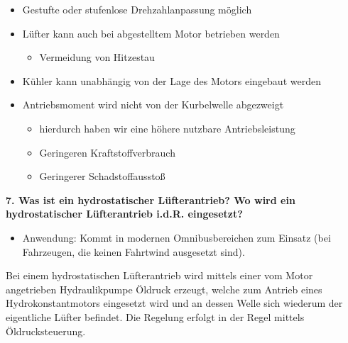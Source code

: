 \begin{itemize}
\item
  Gestufte oder stufenlose Drehzahlanpassung möglich
\item
  Lüfter kann auch bei abgestelltem Motor betrieben werden

  \begin{itemize}
  \item
    Vermeidung von Hitzestau
  \end{itemize}
\item
  Kühler kann unabhängig von der Lage des Motors eingebaut werden
\item
  Antriebsmoment wird nicht von der Kurbelwelle abgezweigt

  \begin{itemize}
  \item
    hierdurch haben wir eine höhere nutzbare Antriebsleistung
  \item
    Geringeren Kraftstoffverbrauch
  \item
    Geringerer Schadstoffausstoß
  \end{itemize}
\end{itemize}

\textbf{7. Was ist ein hydrostatischer Lüfterantrieb? Wo wird ein
hydrostatischer Lüfterantrieb i.d.R. eingesetzt?}

\begin{itemize}
\item
  Anwendung: Kommt in modernen Omnibusbereichen zum Einsatz (bei
  Fahrzeugen, die keinen Fahrtwind ausgesetzt sind).
\end{itemize}

Bei einem hydrostatischen Lüfterantrieb wird mittels einer vom Motor
angetrieben Hydraulikpumpe Öldruck erzeugt, welche zum Antrieb eines
Hydrokonstantmotors eingesetzt wird und an dessen Welle sich wiederum
der eigentliche Lüfter befindet. Die Regelung erfolgt in der Regel
mittels Öldrucksteuerung.
